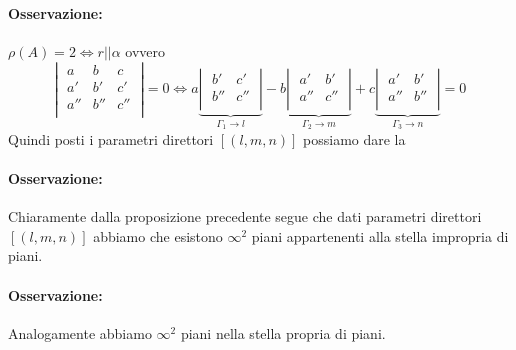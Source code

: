 \paragraph{Osservazione:} \(\rho(A) = 2 \iff r || \alpha \) ovvero \[
\left| \; \begin{matrix}
    a & b & c \\
    a' & b' & c' \\
    a '' & b '' & c '' \\
\end{matrix} \; \right| = 0 \iff 
a \underbrace{
\left| \; \begin{matrix}
    b' & c' \\
    b '' & c '' \\
\end{matrix} \; \right|
}_{ \Gamma_1 \to l } 
- b 
\underbrace{
\left| \; \begin{matrix}
    a' & b' \\
    a '' & c '' \\
\end{matrix} \; \right| 
}_{\Gamma_2 \to m} 
+ c
\underbrace{
\left| \; \begin{matrix}
    a' & b' \\
    a '' & b '' \\
\end{matrix} \; \right|
}_{\Gamma_3 \to n} = 0
\] Quindi posti i parametri direttori \([(l,m,n)]\) possiamo dare la

\paragraph{Osservazione:} Chiaramente dalla proposizione precedente segue che dati parametri direttori \([(l,m,n)]\) abbiamo che esistono \(\infty^{2}\) piani appartenenti alla stella impropria di piani.

\paragraph{Osservazione:} Analogamente abbiamo \(\infty^{2}\) piani nella stella propria di piani.


